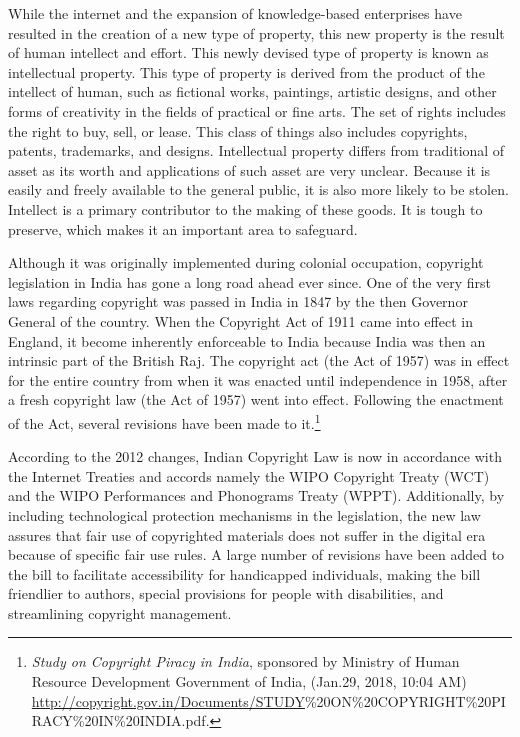 \begin{multicols}{2}
\noi
While the internet and the expansion of knowledge-based enterprises have resulted in the
creation of a new type of property, this new property is the result of human intellect and
effort. This newly devised type of property is known as intellectual property. This type of
property is derived from the product of the intellect of human, such as fictional works,
paintings, artistic designs, and other forms of creativity in the fields of practical or fine arts.
The set of rights includes the right to buy, sell, or lease. This class of things also includes
copyrights, patents, trademarks, and designs. Intellectual property differs from traditional of
asset as its worth and applications of such asset are very unclear. Because it is easily and freely available to the general public, it is also more likely to be stolen. Intellect is a primary
contributor to the making of these goods. It is tough to preserve, which makes it an important
area to safeguard.

\vspace{.1cm}


\vspace{.1cm}

\noi
Although it was originally implemented during colonial occupation, copyright legislation in
India has gone a long road ahead ever since. One of the very first laws regarding copyright
was passed in India in 1847 by the then Governor General of the country. When the
Copyright Act of 1911 came into effect in England, it become inherently enforceable to India
because India was then an intrinsic part of the British Raj. The copyright act (the Act of
1957) was in effect for the entire country from when it was enacted until independence in
1958, after a fresh copyright law (the Act of 1957) went into effect. Following the enactment
of the Act, several revisions have been made to it.\footnote{\textit{Study on Copyright Piracy in India}, sponsored by Ministry of Human Resource Development Government of India, (Jan.29, 2018, 10:04 AM)\\ \url{http://copyright.gov.in/Documents/STUDY}\%20ON\%20COPYRIGHT\%20PIRACY\%20IN\%20INDIA.pdf.}


\noi
According to the 2012 changes, Indian Copyright Law is now in accordance with the Internet
Treaties and accords namely the WIPO Copyright Treaty (WCT) and the WIPO
Performances and Phonograms Treaty (WPPT). Additionally, by including technological
protection mechanisms in the legislation, the new law assures that fair use of copyrighted
materials does not suffer in the digital era because of specific fair use rules. A large number
of revisions have been added to the bill to facilitate accessibility for handicapped individuals,
making the bill friendlier to authors, special provisions for people with disabilities, and
streamlining copyright management.


\end{multicols}
